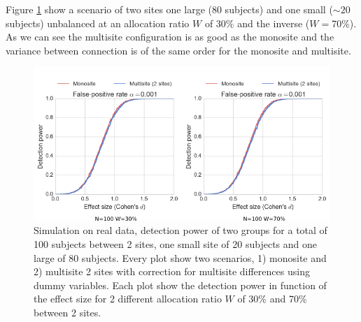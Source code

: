 \documentclass[authoryear]{elsarticle}
\begin{document}
Figure \ref{fig_real_sim_debalancing_2sites} show a scenario of two sites one large (80 subjects) and one small ($\sim20$ subjects) unbalanced at an allocation ratio $W$ of 30\% and the inverse ($W=$70\%). As we can see the multisite configuration is as good as the monosite and the variance between connection is of the same order for the monosite and multisite.

\begin{figure}[tbp]
\centering
\captionsetup[subfloat]{labelformat=empty}
\includegraphics[width=.75\textwidth]{../figures/simulations_real_2sites.png}
\caption{
Simulation on real data, detection power of two groups for a total of 100 subjects between 2 sites, one small site of 20 subjects and one large of 80 subjects. Every plot show two scenarios, 1) monosite and 2) multisite 2 sites with correction for multisite differences using dummy variables. Each plot show the detection power in function of the effect size for 2 different allocation ratio $W$ of 30\% and 70\% between 2 sites.
}
\label{fig_real_sim_debalancing_2sites}
\end{figure}
\end{document}
